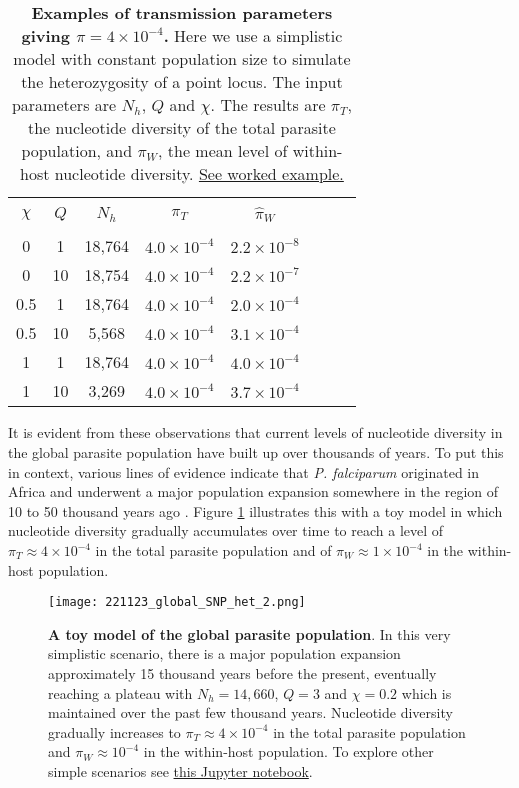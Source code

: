 \documentclass[_main.tex]{subfiles}
\begin{document}
 \begin{table}[h!] 
\centering
\small{
\begin{tabular}{c c c c c c c c} 
\hline \\
$\chi$ & $Q$ & $N_h$ & $\pi_T$ & $\widehat{\pi}_W$ \\ [0.5ex] 
\hline \\
0 & 1 & 18,764 & $4.0 \times 10^{-4}$ & $2.2 \times 10^{-8}$ \\ [2ex]
0 & 10 & 18,754 & $4.0 \times 10^{-4}$ & $2.2 \times 10^{-7}$ \\ [2ex]
0.5 & 1 & 18,764 & $4.0 \times 10^{-4}$ & $2.0 \times 10^{-4}$ \\ [2ex]
0.5 & 10 & 5,568 & $4.0 \times 10^{-4}$ & $3.1 \times 10^{-4}$ \\ [2ex]
1 & 1 & 18,764 & $4.0 \times 10^{-4}$ & $4.0 \times 10^{-4}$ \\ [2ex]
1 & 10 & 3,269 & $4.0 \times 10^{-4}$ & $3.7 \times 10^{-4}$ \\ [2ex]
\hline
\end{tabular}
}
\caption{\small{\textbf{Examples of transmission parameters giving $\pi = 4 \times 10^{-4}$.}  Here we use a simplistic model with constant population size to simulate the heterozygosity of a point locus.  The input parameters are $N_h$, $Q$ and $\chi$.  The results are $\pi_T$, the nucleotide diversity of the total parasite population, and $\widehat{\pi}_W$, the mean level of within-host nucleotide diversity.  \href{https://d-kwiat.github.io/gtg/nucleotide-diversity.html}{See worked example.}}}
\label{table:comb_of_trans_var}
\end{table}

It is evident from these observations that current levels of nucleotide diversity in the global parasite population have built up over thousands of years.  To put this in context, various lines of evidence indicate that \textit{P. falciparum} originated in Africa and underwent a major population expansion somewhere in the region of 10 to 50 thousand years ago \cite{Joy2003,Tanabe2010}.  Figure  \ref{fig:main_global_pi_1} illustrates this with a toy model in which nucleotide diversity gradually accumulates over time to reach a level of $\pi_T \approx 4 \times 10^{-4}$ in the total parasite population and of $\pi_W \approx 1 \times 10^{-4}$ in the within-host population. 

\begin{figure}[h!]
\centering
\texttt{[image: 221123\_global\_SNP\_het\_2.png]}
\caption{\textbf{A toy model of the global parasite population}.  In this very simplistic scenario, there is a major population expansion approximately 15 thousand years before the present, eventually reaching a plateau with $N_h = 14,660$, $Q = 3$ and $\chi = 0.2$ which is maintained over the past few thousand years.  Nucleotide diversity gradually increases to $\pi_T \approx 4 \times 10^{-4}$ in the total parasite population and $\pi_W \approx 10^{-4}$ in the within-host population.  To explore other simple scenarios see \href{https://github.com/d-kwiat/gtg/blob/main/species_history.ipynb}{this Jupyter notebook}.}
\label{fig:main_global_pi_1}
\end{figure}
\end{document}
